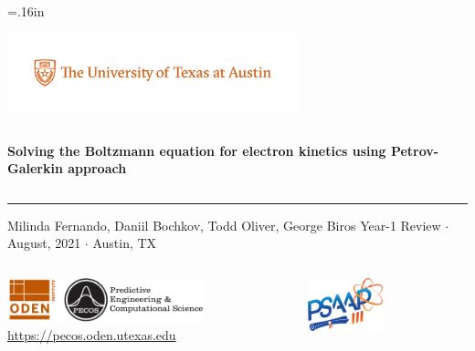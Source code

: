 \documentclass[mathserif, aspectratio=169]{beamer}
\begin{document}


\hoffset=.16in

\begin{frame}[plain,t]{}
\makeatletter
\includegraphics[height=0.9in,trim=50 40 40 0, clip]{PMSc_159_university_formal_horizontal.pdf} \newline
\begin{columns}[T,onlytextwidth]
{\bf \color{burntorange} \selectfont 
Solving the Boltzmann equation for electron kinetics using Petrov-Galerkin approach
}
\end{columns}
\vspace*{.15cm}
\rule{.8\textwidth}{0.6pt} \newline

\vspace*{0.05cm}
{\selectfont
  { \scriptsize
    Milinda Fernando, Daniil Bochkov, Todd Oliver, George Biros\newline
  }
  {\color{burntorange} \tiny
    Year-1 Review $\cdot$ August, 2021 $\cdot$ Austin, TX
  }
}

\vspace*{1cm}
\begin{columns}
\begin{column}{0.8\linewidth}
\includegraphics[height=0.5in]{oden_pecos_2020_wordmark.png}\\
{\scriptsize \url{https://pecos.oden.utexas.edu}}
\end{column}

\begin{column}{0.2\linewidth}
\includegraphics[height=0.6in]{psaap3-logo.png}
\end{column}
\end{columns}

\end{frame}
\hoffset=0in
\end{document}
